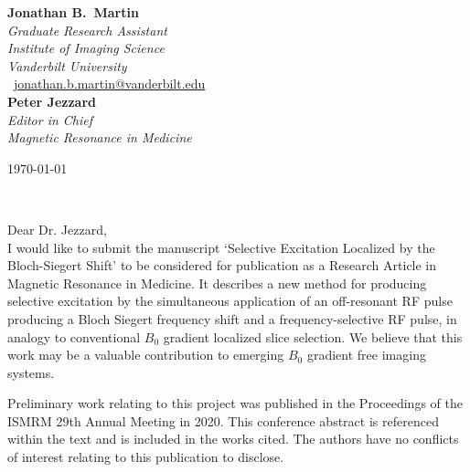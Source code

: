 \documentclass[11pt]{article}
\def\firstname{Jonathan B.}
\def\familyname{Martin}
\begin{document}
\sffamily   %
\raggedright%
{\bfseries \firstname~\familyname}\\[.35ex]
\small{\itshape%
Graduate Research Assistant\\
Institute of Imaging Science\\
Vanderbilt University\\}
\Letter~\href{mailto:jonathan.b.martin@vanderbilt.edu}{jonathan.b.martin@vanderbilt.edu}\\[2em]
{\bfseries Peter Jezzard}\\[.35ex]
\small{\itshape
Editor in Chief\\
Magnetic Resonance in Medicine\\[1em]}
%
\large
\hfill\begin{minipage}[t]{\textwidth} %
\raggedleft %
\today
\end{minipage}\\[2em]
\raggedright
Dear Dr. Jezzard,\\[1.5em]
%
I would like to submit the manuscript `Selective Excitation Localized by the Bloch-Siegert Shift' to be considered
for publication as a Research Article in Magnetic Resonance in Medicine. It describes a new method for producing selective excitation by the simultaneous application of an off-resonant RF pulse producing a Bloch Siegert frequency shift and a frequency-selective RF pulse, in analogy to conventional $B_0$ gradient localized slice selection.
We believe that this work may be a valuable contribution to emerging $B_0$ gradient free imaging systems. 

Preliminary work relating to this project was published in the Proceedings of the ISMRM 29th Annual Meeting in 2020. This conference abstract is referenced within the text and is included in the works cited. The authors have no conflicts of interest relating to this publication to disclose.
\end{document}
